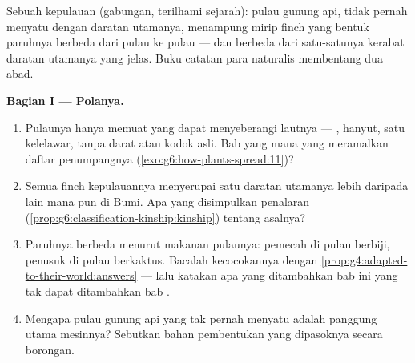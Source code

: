 \begin{problem}\label{pb:g9:how-species-change:1}
Sebuah kepulauan (gabungan, terilhami sejarah): pulau gunung
api, tidak pernah menyatu dengan daratan utamanya,
menampung  mirip finch yang bentuk paruhnya berbeda
dari pulau ke pulau --- dan berbeda dari satu-satunya
kerabat daratan utamanya yang jelas. Buku catatan para
naturalis membentang dua abad.

\medskip\noindent\textbf{Bagian I --- Polanya.}
\begin{enumerate}
  \item Pulaunya hanya memuat  yang dapat
        menyeberangi lautnya --- ,  hanyut, satu
        kelelawar, tanpa  darat atau kodok asli. Bab
        yang mana yang meramalkan daftar penumpangnya
        (\cref{exo:g6:how-plants-spread:11})?
  \item Semua  finch kepulauannya menyerupai satu
         daratan utamanya lebih daripada  lain
        mana pun di Bumi. Apa yang disimpulkan penalaran
        (\cref{prop:g6:classification-kinship:kinship})
        tentang asalnya?
  \item Paruhnya berbeda menurut makanan pulaunya: pemecah
         di pulau berbiji, penusuk di pulau berkaktus.
        Bacalah kecocokannya dengan
        \cref{prop:g4:adapted-to-their-world:answers} ---
        lalu katakan apa yang ditambahkan bab ini yang tak
        dapat ditambahkan bab .
  \item Mengapa pulau gunung api yang tak pernah menyatu
        adalah panggung utama mesinnya? Sebutkan bahan
        pembentukan  yang dipasoknya secara borongan.
\end{enumerate}


\end{problem}
